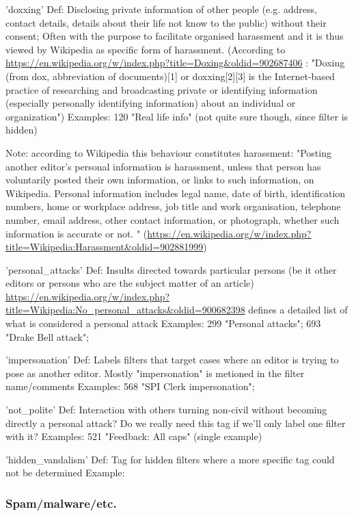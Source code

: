 'doxxing'
  Def: Disclosing private information of other people (e.g. address, contact details, details about their life not know to the public) without their consent; Often with the purpose to facilitate organised harassment and it is thus viewed by Wikipedia as specific form of harassment.
  (According to \url{https://en.wikipedia.org/w/index.php?title=Doxing&oldid=902687406} : "Doxing (from dox, abbreviation of documents)[1] or doxxing[2][3] is the Internet-based practice of researching and broadcasting private or identifying information (especially personally identifying information) about an individual or organization")
  Examples: 120 "Real life info" (not quite sure though, since filter is hidden)

Note: according to Wikipedia this behaviour constitutes harassment: "Posting another editor's personal information is harassment, unless that person has voluntarily posted their own information, or links to such information, on Wikipedia. Personal information includes legal name, date of birth, identification numbers, home or workplace address, job title and work organisation, telephone number, email address, other contact information, or photograph, whether such information is accurate or not. " (\url{https://en.wikipedia.org/w/index.php?title=Wikipedia:Harassment&oldid=902881999})

'personal\_attacks'
  Def: Insults directed towards particular persons (be it other editors or persons who are the subject matter of an article)
  \url{https://en.wikipedia.org/w/index.php?title=Wikipedia:No_personal_attacks&oldid=900682398} defines a detailed list of what is considered a personal attack
  Examples: 299 "Personal attacks"; 693 "Drake Bell attack";

'impersonation'
  Def: Labels filters that target cases where an editor is trying to pose as another editor. Mostly "impersonation" is metioned in the filter name/comments
  Examples: 568 "SPI Clerk impersonation";

'not\_polite'
  Def: Interaction with others turning non-civil without becoming directly a personal attack? Do we really need this tag if we'll only label one filter with it?
  Examples: 521 "Feedback: All caps" (single example)

'hidden\_vandalism'
 Def: Tag for hidden filters where a more specific tag could not be determined
 Example:


\subsubsection{Spam/malware/etc.}

